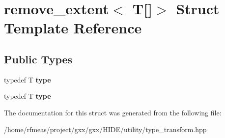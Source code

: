 \hypertarget{structremove__extent_3_01T[]_4}{}\section{remove\+\_\+extent$<$ T\mbox{[}\mbox{]}$>$ Struct Template Reference}
\label{structremove__extent_3_01T[]_4}
\subsection*{Public Types}
\begin{DoxyCompactItemize}
\item 
typedef T {\bfseries type}\hypertarget{structremove__extent_3_01T[]_4_a0367148f38de8362ae0dd9bb2a1c1a8c}{}\label{structremove__extent_3_01T[]_4_a0367148f38de8362ae0dd9bb2a1c1a8c}

\item 
typedef T {\bfseries type}\hypertarget{structremove__extent_3_01T[]_4_a0367148f38de8362ae0dd9bb2a1c1a8c}{}\label{structremove__extent_3_01T[]_4_a0367148f38de8362ae0dd9bb2a1c1a8c}

\end{DoxyCompactItemize}


The documentation for this struct was generated from the following file\+:\begin{DoxyCompactItemize}
\item 
/home/rfmeas/project/gxx/gxx/\+H\+I\+D\+E/utility/type\+\_\+transform.\+hpp\end{DoxyCompactItemize}
